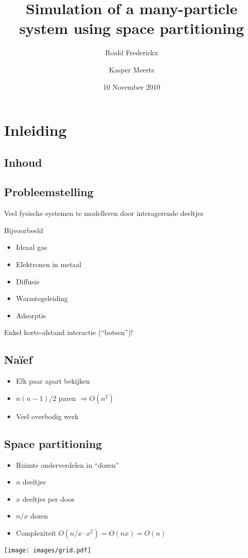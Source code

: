 \documentclass{beamer}
\title{Simulation of a many-particle system using space partitioning}
\author{Roald Frederickx \and Kasper Meerts}
\date{10 November 2010}
\newcommand{\includeGraph}[2]{
	\begin{center}
	\scalebox{#1}{
		
	}
	\end{center}
}
\begin{document}
\begin{frame}
\titlepage
\end{frame}

\section{Inleiding}
\subsection{Inhoud}
\begin{frame}
\tableofcontents[hideallsubsections]
\end{frame}

\subsection{Probleemstelling}
\begin{frame}
Veel fysische systemen te modelleren door interagerende deeltjes

Bijvoorbeeld
\begin{itemize}
\item Ideaal gas
\item Elektronen in metaal
\item Diffusie
\item Warmtegeleiding
\item Adsorptie
\end{itemize}

Enkel korte-afstand interactie (``botsen'')!
\end{frame}

\subsection{Na\"ief}
\begin{frame}
\begin{itemize}
\item Elk paar apart bekijken
\item $n(n-1)/2$ paren $\Rightarrow O(n^2)$
\item Veel overbodig werk
\end{itemize}
\includeGraph{0.6}{quadraticComplexity}
\end{frame}

\subsection{Space partitioning}
\begin{frame}
\begin{itemize}
\item Ruimte onderverdelen in ``dozen''
\item $n$ deeltjes
\item $x$ deeltjes per doos
\item $n/x$ dozen
\item Complexiteit $O(n/x \cdot x^2) = O(nx) = O(n)$
\end{itemize}
\begin{center}
\texttt{[image: images/grid.pdf]}
\end{center}
\end{frame}
\end{document}
